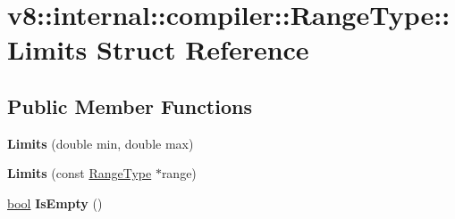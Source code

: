 \hypertarget{structv8_1_1internal_1_1compiler_1_1RangeType_1_1Limits}{}\section{v8\+:\+:internal\+:\+:compiler\+:\+:Range\+Type\+:\+:Limits Struct Reference}
\label{structv8_1_1internal_1_1compiler_1_1RangeType_1_1Limits}
\subsection*{Public Member Functions}
\begin{DoxyCompactItemize}
\item 
\mbox{\label{structv8_1_1internal_1_1compiler_1_1RangeType_1_1Limits_a3581501dc1524e7f8e34b35d4691361a}} 
{\bfseries Limits} (double min, double max)
\item 
\mbox{\label{structv8_1_1internal_1_1compiler_1_1RangeType_1_1Limits_aa704bb319fd42f84620ef068ebd335e0}} 
{\bfseries Limits} (const \mbox{\hyperlink{classv8_1_1internal_1_1compiler_1_1RangeType}{Range\+Type}} $\ast$range)
\item 
\mbox{\label{structv8_1_1internal_1_1compiler_1_1RangeType_1_1Limits_a61093e5d219053488b6165cdfd7869ef}} 
\mbox{\hyperlink{classbool}{bool}} {\bfseries Is\+Empty} ()
\end{DoxyCompactItemize}
